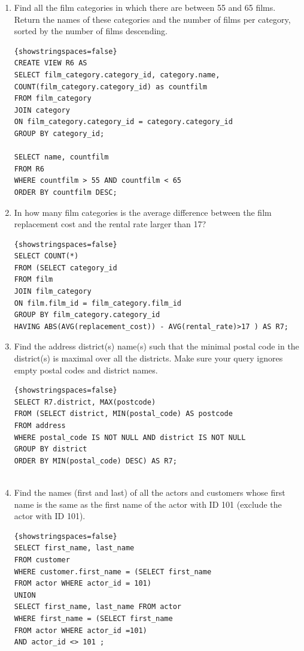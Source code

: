 \documentclass{article}
\begin{document}
\begin{enumerate}
	\item Find all the film categories in which there are between 55 and 65 films. Return the names of these categories and the number of films per category, sorted by the number of films descending.
	
	\begin{lstlisting}{showstringspaces=false}
CREATE VIEW R6 AS
SELECT film_category.category_id, category.name, 
COUNT(film_category.category_id) as countfilm	
FROM film_category
JOIN category 
ON film_category.category_id = category.category_id 
GROUP BY category_id;
		   
SELECT name, countfilm 
FROM R6 
WHERE countfilm > 55 AND countfilm < 65
ORDER BY countfilm DESC;
	\end{lstlisting}

	\item In how many film categories is the average difference between the film replacement cost and the rental rate larger than 17?
	
	\begin{lstlisting}{showstringspaces=false}
SELECT COUNT(*)
FROM (SELECT category_id  
FROM film 
JOIN film_category 
ON film.film_id = film_category.film_id
GROUP BY film_category.category_id
HAVING ABS(AVG(replacement_cost)) - AVG(rental_rate)>17 ) AS R7;
	\end{lstlisting}

	\item Find the address district(s) name(s) such that the minimal postal code in the district(s) is maximal over all the districts. Make sure your query ignores empty postal codes and district names.
	
	\begin{lstlisting}{showstringspaces=false}
SELECT R7.district, MAX(postcode)
FROM (SELECT district, MIN(postal_code) AS postcode 
FROM address 
WHERE postal_code IS NOT NULL AND district IS NOT NULL
GROUP BY district 
ORDER BY MIN(postal_code) DESC) AS R7;
   
	\end{lstlisting}
		
	\item Find the names (first and last) of all the actors and customers whose first name is the same as the first name of the actor with ID 101 (exclude the actor with ID 101).
	
	\begin{lstlisting}{showstringspaces=false}
SELECT first_name, last_name
FROM customer 
WHERE customer.first_name = (SELECT first_name
FROM actor WHERE actor_id = 101)
UNION
SELECT first_name, last_name FROM actor 
WHERE first_name = (SELECT first_name 
FROM actor WHERE actor_id =101) 
AND actor_id <> 101 ;
	
	\end{lstlisting}
			
\end{enumerate}
\end{document}
